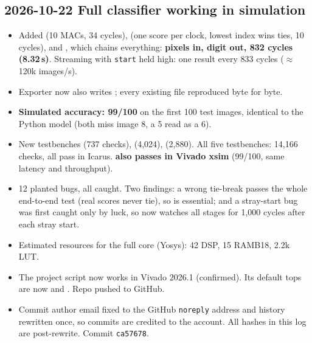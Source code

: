 \documentclass[11pt]{article}
\begin{document}
\subsection*{2026-10-22 \quad Full classifier working in simulation}
\begin{itemize}
  \item Added  (10 MACs, 34 cycles),  (one
        score per clock, lowest index wins ties, 10 cycles), and ,
        which chains everything: \textbf{pixels in, digit out, 832 cycles (8.32\,\textmu s)}.
        Streaming with \texttt{start} held high: one result every 833 cycles
        ($\approx$120k images/s).
  \item Exporter now also writes ; every existing file reproduced
        byte for byte.
  \item \textbf{Simulated accuracy: 99/100} on the first 100 test images, identical to
        the Python model (both miss image 8, a 5 read as a 6).
  \item New testbenches  (737 checks),  (4{,}024),
         (2{,}880). All five testbenches: 14{,}166 checks, all pass
        in Icarus. \textbf{ also passes in Vivado xsim} (99/100,
        same latency and throughput).
  \item 12 planted bugs, all caught. Two findings: a wrong tie-break passes the whole
        end-to-end test (real scores never tie), so  is essential; and a
        stray-start bug was first caught only by luck, so  now watches
        all stages for 1{,}000 cycles after each stray start.
  \item Estimated resources for the full core (Yosys): 42 DSP, 15 RAMB18, 2.2k LUT.
  \item The project script now works in Vivado 2026.1 (confirmed). Its default
        tops are now  and . Repo pushed to GitHub.
  \item Commit author email fixed to the GitHub \texttt{noreply} address and history
        rewritten once, so commits are credited to the account. All hashes in this log
        are post-rewrite. Commit \texttt{ca57678}.
\end{itemize}
\end{document}
